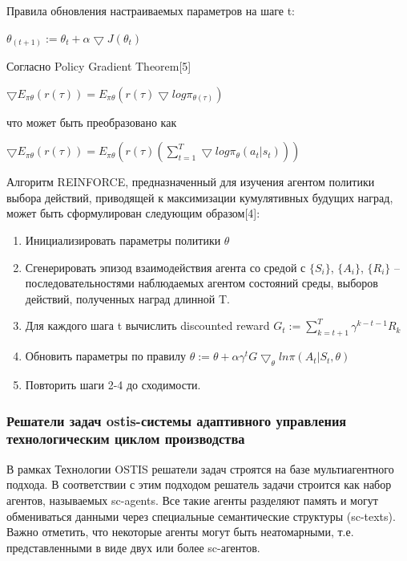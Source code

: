 Правила обновления настраиваемых параметров на шаге t:

$\theta _{(t+1)} := \theta _{t}+ \alpha  \bigtriangledown J( \theta _t)$


Согласно Policy Gradient Theorem[5]

$\bigtriangledown E_{ \pi  \theta } (r( \tau ) )=E_{ \pi  \theta } (r( \tau ) \bigtriangledown log \pi _{ \theta  ( \tau )})$


что может быть преобразовано как

$\bigtriangledown E_{ \pi  \theta } (r( \tau ) )=E_{ \pi  \theta } (r( \tau )( \sum_{t=1}^{T}  \bigtriangledown log  \pi _{ \theta } (a_t |s_t)))$


Алгоритм REINFORCE, предназначенный для изучения агентом политики выбора действий, приводящей к максимизации кумулятивных будущих наград, может быть сформулирован следующим образом[4]:

\begin{enumerate}
    \item Инициализировать параметры политики $\theta$
    \item Сгенерировать эпизод взаимодействия агента со средой с $\{S_i \}$, $\{A_i \}$, $\{R_i \}$   – последовательностями наблюдаемых агентом состояний среды, выборов действий, полученных наград длинной T.
    \item Для каждого шага t вычислить discounted reward $G_t :=  \sum_{k=t+1}^{T}   \gamma ^{k-t-1} R_k  $
    \item Обновить параметры по правилу $\theta :=  \theta + \alpha  \gamma ^t G \bigtriangledown_ \theta  ln \pi (A_t |S_t, \theta )$
    \item Повторить шаги 2-4 до сходимости.


\end{enumerate}


\subsubsection{Решатели задач ostis-системы адаптивного управления технологическим циклом производства}

В рамках Технологии OSTIS решатели задач строятся на базе мультиагентного подхода. В соответствии с этим подходом решатель задачи строится как набор агентов, называемых sc-agents. Все такие агенты разделяют память и могут обмениваться данными через специальные семантические структуры (sc-texts). Важно отметить, что некоторые агенты могут быть неатомарными, т.е. представленными в виде двух или более sc-агентов.

